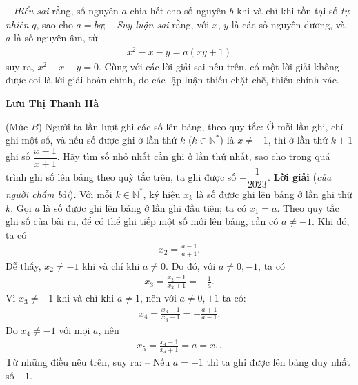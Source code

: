 \begin{multicols}{2}
	\vskip 0.05cm 
	-- \textit{Hiểu sai} rằng, số nguyên $a$ chia hết cho số nguyên $b$ khi và chỉ khi tồn tại số \textit{tự nhiên} $q$, sao cho $a = bq$;
	\vskip 0.05cm
	--\textit{ Suy luận sai} rằng, với $x$, $y$ là các số nguyên dương, và $a$ là số nguyên âm, từ
	\begin{align*}
		{x^2} - x - y = a\left( {xy + 1} \right)
	\end{align*}
	suy ra, $x^2 - x - y = 0$.
	\vskip 0.05cm  
	Cùng với các lời giải sai nêu trên, có một lời giải không được coi là lời giải hoàn chỉnh, do các lập luận thiếu chặt chẽ, thiếu chính xác.
	\begin{flushright}
		\textbf{\color{thachthuctoanhoc}Lưu Thị Thanh Hà}
	\end{flushright}
	{}
	(Mức $B$)
	Người ta lần lượt ghi các số lên bảng, theo quy tắc: Ở mỗi lần ghi, chỉ ghi một số, và nếu số được ghi ở lần thứ $k$ ($k \in \mathbb{N^*}$) là $x \ne -1$,  thì ở lần thứ $k + 1$ ghi số $\dfrac{x-1}{x+1}$. Hãy tìm số nhỏ nhất cần ghi ở lần thứ nhất, sao cho trong quá trình ghi số lên bảng theo quỳ tắc trên, ta ghi được số $-\dfrac{1}{2023}$.
	\vskip 0.05cm
	\textbf{\color{thachthuctoanhoc}Lời giải} (\textit{của người chấm bài})\textbf{\color{thachthuctoanhoc}.}
	\vskip 0.05cm
	Với mỗi $k \in \mathbb{N^*}$,  ký hiệu $x_k$  là số được ghi lên bảng ở lần ghi thứ $k$.
	\vskip 0.05cm
	Gọi $a$ là số được ghi lên bảng ở lần ghi đầu tiên; ta có $x_1 = a$.
	\vskip 0.05cm 
	Theo quy tắc ghi số của bài ra, để có thể ghi tiếp một số mới lên bảng, cần có $a \ne -1$.  Khi đó, ta có
	\begin{align*}
		{x_2} = \frac{{a - 1}}{{a + 1}}.
	\end{align*}
	Dễ thấy, $x_2 \ne -1$   khi và chỉ khi $a \ne 0$. Do đó, với $a \ne 0 ,-1$,   ta có
	\begin{align*}
		{x_3} = \frac{{{x_2} - 1}}{{{x_2} + 1}} =  - \frac{1}{a}.
	\end{align*}
	Vì $x_3 \ne -1$ khi và chỉ khi $a \ne 1$, nên với $a \ne 0, \pm 1$  ta có:
	\begin{align*}
		{x_4} = \frac{{{x_3} - 1}}{{{x_3} + 1}} =  - \frac{{a + 1}}{{a - 1}}.
	\end{align*}
	Do $x_4 \ne -1$ với mọi $a$, nên
	\begin{align*}
		{x_5} = \frac{{{x_4} - 1}}{{{x_4} + 1}} = a = {x_1}.
	\end{align*}
	Từ những điều nêu trên, suy ra:
	\vskip 0.05cm
	-- Nếu $a = -1$  thì ta ghi được lên bảng duy nhất số $-1$.
	\vskip 0.05cm 

\end{multicols}
